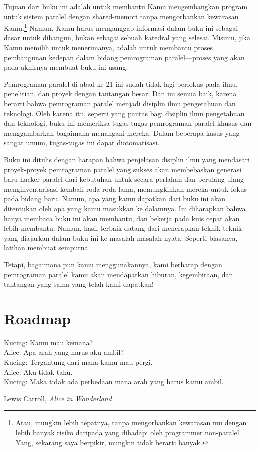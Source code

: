 
%

Tujuan dari buku ini adalah untuk membantu Kamu mengembangkan
program untuk sistem paralel dengan shared-memori tanpa mengorbankan
kewarasan Kamu.\footnote{
	Atau, mungkin lebih tepatnya, tanpa mengorbankan kewarasan mu
	dengan lebih banyak risiko daripada yang dihadapi oleh programmer
	non-paralel.
	Yang, sekarang saya berpikir, mungkin tidak berarti banyak.}
Namun, Kamu harus menganggap informasi dalam buku ini sebagai
dasar untuk dibangun, bukan sebagai sebuah katedral yang selesai.
Misimu, jika Kamu memilih untuk menerimanya, adalah untuk membantu
proses pembangunan kedepan dalam bidang pemrograman paralel---proses
yang akan pada akhirnya membuat buku ini usang.

Pemrograman paralel di abad ke 21 ini sudah tidak lagi berfokus pada
ilmu, penelitian, dan proyek dengan tantangan besar.
Dan ini semua baik, karena berarti bahwa pemrograman paralel menjadi
disiplin ilmu pengetahuan dan teknologi.
Oleh karena itu, seperti yang pantas bagi disiplin ilmu pengetahuan dan teknologi,
buku ini memeriksa tugas-tugas pemrograman paralel khusus dan menggambarkan
bagaimana menangani mereka.
Dalam beberapa kasus yang sangat umum, tugas-tugas ini dapat diotomatisasi.

Buku ini ditulis dengan harapan bahwa penjelasan disiplin ilmu
yang mendasari proyek-proyek pemrograman paralel yang sukses akan membebaskan
generasi baru hacker paralel dari kebutuhan untuk secara perlahan dan
berulang-ulang menginventarisasi kembali roda-roda lama, memungkinkan mereka
untuk fokus pada bidang baru.
Namun, apa yang kamu dapatkan dari buku ini akan ditentukan oleh apa yang
kamu masukkan ke dalamnya.
Ini diharapkan bahwa hanya membaca buku ini akan membantu,
dan bekerja pada kuis cepat akan lebih membantu.
Namun, hasil terbaik datang dari menerapkan teknik-teknik yang diajarkan
dalam buku ini ke masalah-masalah nyata.
Seperti biasanya, latihan membuat sempurna.

Tetapi, bagaimana pun kamu menggunakannya, kami berharap dengan pemrograman
paralel kamu akan mendapatkan hiburan, kegembiraan, dan tantangan yang sama
yang telah kami dapatkan!

\section{Roadmap}
\label{sec:howto:Roadmap}
%
\epigraph{Kucing:
		Kamu mau kemana? \\
	  Alice:
		Apa arah yang harus aku ambil? \\
	  Kucing:
		Tergantung dari mana kamu mau pergi. \\
	  Alice:
		Aku tidak tahu. \\
	  Kucing:
		Maka tidak ada perbedaan mana arah yang harus kamu ambil.}
	{Lewis Carroll, \emph{Alice in Wonderland}}

